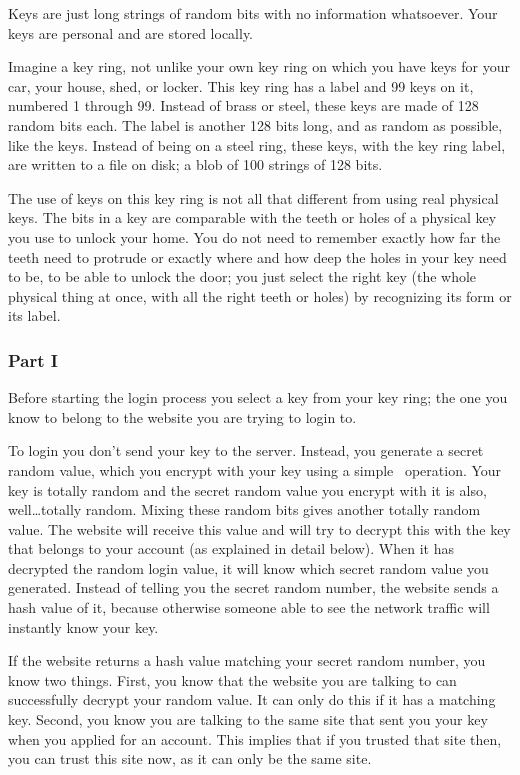 Keys are just long strings of random bits with no information whatsoever.
Your keys are personal and are stored locally.
\par
Imagine a key ring,
	not unlike your own key ring on which you have keys for your car,
		your house,
			shed,
				or locker.
This key ring has a label and 99 keys on it,
	numbered 1 through 99.
Instead of brass or steel,
	these keys are made of 128 random bits each.
The label is another 128 bits long,
	and as random as possible,
		like the keys.
Instead of being on a steel ring,
	these keys,
		with the key ring label,
			are written to a file on disk;
				a blob of 100 strings of 128 bits.
\par
The use of keys on this key ring is not all that different from using real physical keys.
The bits in a key are comparable with the teeth or holes of a physical key you use to unlock your home.
You do not need to remember exactly how far the teeth need to protrude or exactly where and how deep the holes in your key need to be,
	to be able to unlock the door;
		you just select the right key
			(the whole physical thing at once, with all the right teeth or holes)
				by recognizing its form or its label.



\subsubsection{Part I}
Before starting the login process you select a key from your key ring;
the one you know to belong to the website you are trying to login to.
\par
To login you don't send your key to the server.
Instead, you generate a secret random value,
which you encrypt with your key using a simple \XOR\ operation.
Your key is totally random and the secret random value you encrypt with it is also, well\ldots totally random.
Mixing these random bits gives another totally random value.
The website will receive this value and will try to decrypt this with the key that belongs to your account
(as explained in detail below).
When it has decrypted the random login value,
it will know which secret random value you generated.
Instead of telling you the secret random number,
the website sends a hash value of it,
because otherwise someone able to see the network traffic will instantly know your key.
\par
If the website returns a hash value matching your secret random number, you know two things.
First, you know that the website you are talking to can successfully decrypt your random value.
It can only do this if it has a matching key.
Second, you know you are talking to the same site that sent you your key when you applied for an account.
This implies that if you trusted that site then, you can trust this site now, as it can only be the same site.

